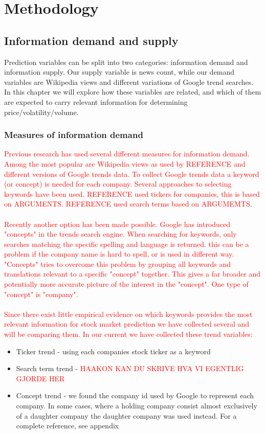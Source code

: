 
\chapter{Methodology}

\section{Information demand and supply}
Prediction variables can be split into two categories: information demand and information supply. Our supply variable is news count, while our demand variables are Wikipedia views and different variations of Google trend searches. In this chapter we will explore how these variables are related, and which of them are expected to carry relevant information for determining price/volatility/volume. 

\subsection{Measures of information demand}
\textcolor{red}{ Previous research has used several different measures for information demand. Among the most popular are Wikipedia views as used by REFERENCE and different versions of Google trends data. To collect Google trends data a keyword (or concept) is needed for each company. Several approaches to selecting keywords have been used. REFERENCE used tickers for companies, this is based on ARGUMENTS. REFERENCE used search terms based on ARGUMEMTS. }
\\\\
\textcolor{red}{ Recently another option has been made possible. Google has introduced "concepts" in the trends search engine. When searching for keywords, only searches matching the specific spelling and language is returned. this can be a problem if the company name is hard to spell, or is used in different way. "Concepts" tries to overcome this problem by grouping all keywords and translations relevant to a specific "concept" together. This gives a far broader and potentially more accurate picture of the interest in the "concept". One type of "concept" is "company". \ }
\\\\
\textcolor{red}{ Since there exist little empirical evidence on which keywords provides the most relevant information for stock market prediction we have collected several and will be comparing them. In our current we have collected these trend variables: }
\begin{itemize}
\item Ticker trend - using each companies stock ticker as a keyword
\item Search term trend - \textcolor{red}{ HAAKON KAN DU SKRIVE HVA VI EGENTLIG GJORDE HER}
\item Concept trend - we found the company id used by Google to represent each company. In some cases, where a holding company consist almost exclusively of a daughter company the daughter company was used instead. For a complete reference, see appendix
\end{itemize}

